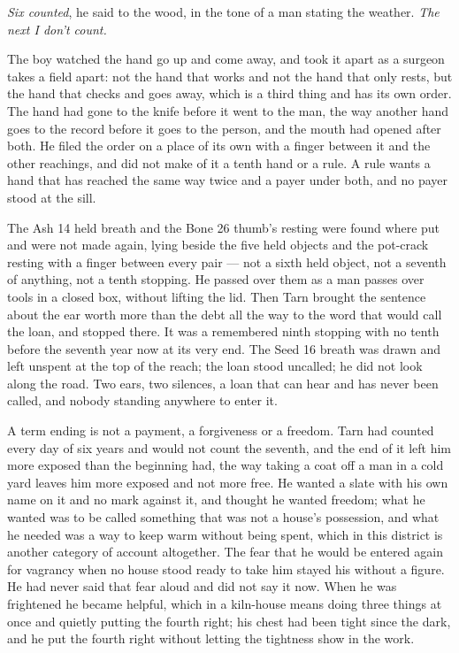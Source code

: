 \emph{Six counted}, he said to the wood, in the tone of a man stating the weather. \emph{The next I don't count.}

The boy watched the hand go up and come away, and took it apart as a surgeon takes a field apart: not the hand that works and not the hand that only rests, but the hand that checks and goes away, which is a third thing and has its own order. The hand had gone to the knife before it went to the man, the way another hand goes to the record before it goes to the person, and the mouth had opened after both. He filed the order on a place of its own with a finger between it and the other reachings, and did not make of it a tenth hand or a rule. A rule wants a hand that has reached the same way twice and a payer under both, and no payer stood at the sill.

The Ash 14 held breath and the Bone 26 thumb's resting were found where put and were not made again, lying beside the five held objects and the pot-crack resting with a finger between every pair --- not a sixth held object, not a seventh of anything, not a tenth stopping. He passed over them as a man passes over tools in a closed box, without lifting the lid. Then Tarn brought the sentence about the ear worth more than the debt all the way to the word that would call the loan, and stopped there. It was a remembered ninth stopping with no tenth before the seventh year now at its very end. The Seed 16 breath was drawn and left unspent at the top of the reach; the loan stood uncalled; he did not look along the road. Two ears, two silences, a loan that can hear and has never been called, and nobody standing anywhere to enter it.

A term ending is not a payment, a forgiveness or a freedom. Tarn had counted every day of six years and would not count the seventh, and the end of it left him more exposed than the beginning had, the way taking a coat off a man in a cold yard leaves him more exposed and not more free. He wanted a slate with his own name on it and no mark against it, and thought he wanted freedom; what he wanted was to be called something that was not a house's possession, and what he needed was a way to keep warm without being spent, which in this district is another category of account altogether. The fear that he would be entered again for vagrancy when no house stood ready to take him stayed his without a figure. He had never said that fear aloud and did not say it now. When he was frightened he became helpful, which in a kiln-house means doing three things at once and quietly putting the fourth right; his chest had been tight since the dark, and he put the fourth right without letting the tightness show in the work.

